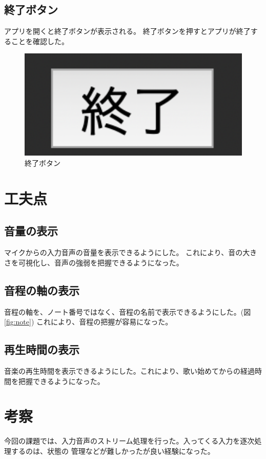 \documentclass[a4paper,11pt]{jsarticle}
\begin{document}
\newpage
\subsection{終了ボタン}
アプリを開くと終了ボタンが表示される。
終了ボタンを押すとアプリが終了することを確認した。

\begin{figure}[h]
\centering
\includegraphics[keepaspectratio, width=13cm]
{./images/work3_quit.png}
\caption{終了ボタン}
\label{fig:quit}
\end{figure}

\section{工夫点}
\subsection{音量の表示}
マイクからの入力音声の音量を表示できるようにした。
これにより、音の大きさを可視化し、音声の強弱を把握できるようになった。

\subsection{音程の軸の表示}
音程の軸を、ノート番号ではなく、音程の名前で表示できるようにした。(図\ref{fig:note})
これにより、音程の把握が容易になった。

\subsection{再生時間の表示}
音楽の再生時間を表示できるようにした。これにより、歌い始めてからの経過時間を把握できるようになった。

\section{考察}
今回の課題では、入力音声のストリーム処理を行った。入ってくる入力を逐次処理するのは、状態の
管理などが難しかったが良い経験になった。

\end{document}
